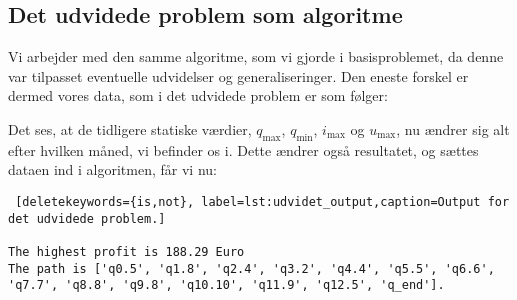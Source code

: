 \subsection{Det udvidede problem som algoritme}
Vi arbejder med den samme algoritme, som vi gjorde i basisproblemet, da denne var tilpasset eventuelle udvidelser og generaliseringer. Den eneste forskel er dermed vores data, som i det udvidede problem er som følger:

 

Det ses, at de tidligere statiske værdier, $q_{\max}$, $q_{\min}$, $i_{\max}$ og $u_{\max}$, nu ændrer sig alt efter hvilken måned, vi befinder os i. Dette ændrer også resultatet, og sættes dataen ind i algoritmen, får vi nu:

\begin{lstlisting} [deletekeywords={is,not}, label=lst:udvidet_output,caption=Output for det udvidede problem.]

The highest profit is 188.29 Euro
The path is ['q0.5', 'q1.8', 'q2.4', 'q3.2', 'q4.4', 'q5.5', 'q6.6', 'q7.7', 'q8.8', 'q9.8', 'q10.10', 'q11.9', 'q12.5', 'q_end'].

\end{lstlisting}